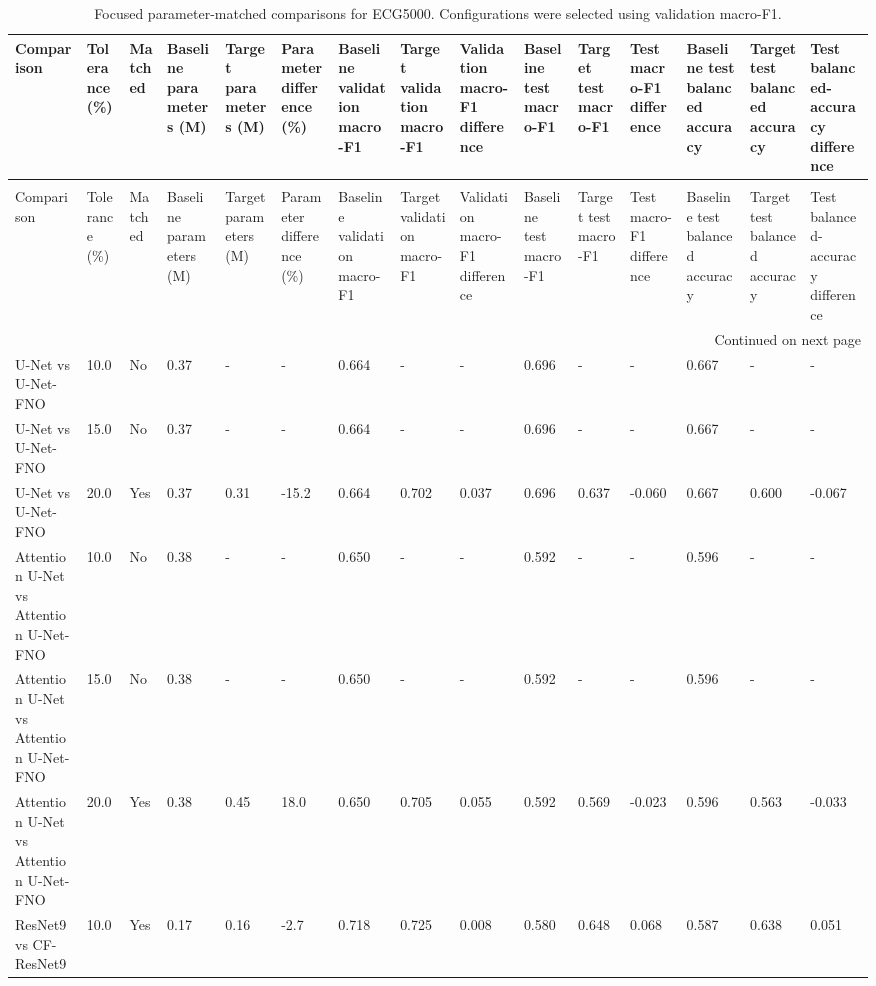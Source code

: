 \begin{longtable}{lllllllllllllll}
\caption{Focused parameter-matched comparisons for ECG5000. Configurations were selected using validation macro-F1.} \label{tab:ecg5000_paired_fno_comparison} \\
\toprule
Comparison & Tolerance (\%) & Matched & Baseline parameters (M) & Target parameters (M) & Parameter difference (\%) & Baseline validation macro-F1 & Target validation macro-F1 & Validation macro-F1 difference & Baseline test macro-F1 & Target test macro-F1 & Test macro-F1 difference & Baseline test balanced accuracy & Target test balanced accuracy & Test balanced-accuracy difference \\
\midrule
\endfirsthead
\caption[]{Focused parameter-matched comparisons for ECG5000. Configurations were selected using validation macro-F1.} \\
\toprule
Comparison & Tolerance (\%) & Matched & Baseline parameters (M) & Target parameters (M) & Parameter difference (\%) & Baseline validation macro-F1 & Target validation macro-F1 & Validation macro-F1 difference & Baseline test macro-F1 & Target test macro-F1 & Test macro-F1 difference & Baseline test balanced accuracy & Target test balanced accuracy & Test balanced-accuracy difference \\
\midrule
\endhead
\midrule
\multicolumn{15}{r}{Continued on next page} \\
\midrule
\endfoot
\bottomrule
\endlastfoot
U-Net vs U-Net-FNO & 10.0 & No & 0.37 & - & - & 0.664 & - & - & 0.696 & - & - & 0.667 & - & - \\
U-Net vs U-Net-FNO & 15.0 & No & 0.37 & - & - & 0.664 & - & - & 0.696 & - & - & 0.667 & - & - \\
U-Net vs U-Net-FNO & 20.0 & Yes & 0.37 & 0.31 & -15.2 & 0.664 & 0.702 & 0.037 & 0.696 & 0.637 & -0.060 & 0.667 & 0.600 & -0.067 \\
Attention U-Net vs Attention U-Net-FNO & 10.0 & No & 0.38 & - & - & 0.650 & - & - & 0.592 & - & - & 0.596 & - & - \\
Attention U-Net vs Attention U-Net-FNO & 15.0 & No & 0.38 & - & - & 0.650 & - & - & 0.592 & - & - & 0.596 & - & - \\
Attention U-Net vs Attention U-Net-FNO & 20.0 & Yes & 0.38 & 0.45 & 18.0 & 0.650 & 0.705 & 0.055 & 0.592 & 0.569 & -0.023 & 0.596 & 0.563 & -0.033 \\
ResNet9 vs CF-ResNet9 & 10.0 & Yes & 0.17 & 0.16 & -2.7 & 0.718 & 0.725 & 0.008 & 0.580 & 0.648 & 0.068 & 0.587 & 0.638 & 0.051 \\

\end{longtable}
